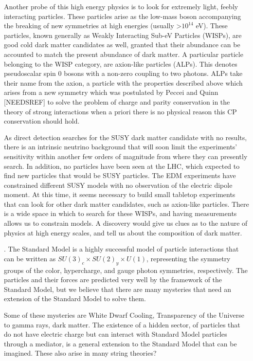 \documentclass[11pt]{book}
\begin{document}
Another probe of this high energy physics is to look for extremely light, feebly interacting particles. These particles arise as the low-mass boson accompanying the breaking of new symmetries at high energies (usually >$10^{14}$ eV). These particles, known generally as Weakly Interacting Sub-eV Particles (WISPs), are good cold dark matter candidates as well, granted that their abundance can be accounted to match the present abundance of dark matter. A particular particle belonging to the WISP category, are axion-like particles (ALPs). This denotes pseudoscalar spin 0 bosons with a non-zero coupling to two photons. ALPs take their name from the axion, a particle with the properties described above which arises from a new symmetry which was postulated by Peccei and Quinn [NEEDSREF] to solve the problem of charge and parity conservation in the theory of strong interactions when a priori there is no physical reason this CP conservation should hold.

As direct detection searches for  the SUSY dark matter candidate with no results, there is an intrinsic neutrino background that will soon limit the experiments' sensitivity within another few orders of magnitude from where they can presently search. In addition, no particles have been seen at the LHC, which expected to find new particles that would be SUSY particles. The EDM experiments have constrained different SUSY models with no observation of the electric dipole moment. At this time, it seems necessary to build small tabletop experiments that can look for other dark matter candidates, such as axion-like particles. There is a wide space in which to search for these WISPs, and having measurements allows us to constrain models. A discovery would give us clues as to the nature of physics at high energy scales, and tell us about the composition of dark matter.




.
The Standard Model is a highly successful model of particle interactions that can be written as $SU(3)_c \times SU(2)_y \times U(1)$, representing the symmetry groups of the color, hypercharge, and gauge photon symmetries, respectively. The particles and their forces are predicted very well by the framework of the Standard Model, but we believe that there are many mysteries that need an extension of the Standard Model to solve them.

Some of these mysteries are White Dwarf Cooling, Transparency of the Universe to gamma rays, dark matter. The existence of a hidden sector, of particles that do not have electric charge but can interact with Standard Model particles through a mediator, is a general extension to the Standard Model that can be imagined. These also arise in many string theories?
\end{document}

